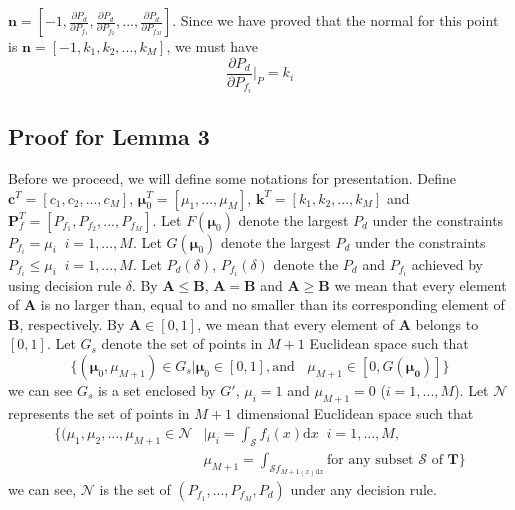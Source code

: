 \documentclass[12pt,journal,a4paper,twoside,onecolumn]{IEEEtran}
\begin{document}
\begin{spacing}{2.5}
 $\mathbf{n} = [-1, \frac{\partial P_d}{\partial P_{f_1}}, \frac{\partial P_d}{\partial P_{f_2}}, ..., \frac{\partial P_d}{\partial P_{f_M}}]$. Since we have proved that  the normal for this point is $\mathbf{n} = [-1, k_1, k_2, ..., k_M]$, we must have
\begin{equation}
\frac{\partial P_d}{\partial P_{f_i}}\bigg|_{P} = k_i
\end{equation}


\subsection{Proof for Lemma 3}
\newcommand{\bmu}{\boldsymbol{\mu}}
Before we proceed, we will define some notations for presentation.
Define $\mathbf{c}^T = [c_1, c_2, ..., c_M]$, $\boldsymbol{\mu}_0^T = [\mu_1, ..., \mu_M]$, $\mathbf{k}^T = [k_1, k_2, ..., k_M]$ and  $\mathbf{P}_f^T = [P_{f_1}, P_{f_2}, ..., P_{f_M}]$. Let $F(\boldsymbol{\mu}_0)$ denote the largest $P_d$ under the constraints $P_{f_i} = \mu_i\;\;i = 1, ..., M$.
Let $G(\boldsymbol{\mu}_0)$ denote the largest $P_d$ under the constraints $P_{f_i} \leq \mu_i\;\;i = 1, ..., M$.
Let $P_d(\delta)$, $P_{f_i}(\delta)$ denote the $P_d$ and $P_{f_i}$ achieved by using decision rule $\delta$.
By $\mathbf{A} \leq \mathbf{B}$, $\mathbf{A} = \mathbf{B}$ and  $\mathbf{A} \geq \mathbf{B}$ we mean that every element of $\mathbf{A}$ is no larger than, equal to and no smaller than its corresponding element of $\mathbf{B}$, respectively. 
By $\mathbf{A} \in [0, 1]$, we mean that every element of $\mathbf{A}$ belongs to $[0, 1]$.  
Let $G_s$ denote the set of points in $M+1$ Euclidean space such that 
\[
 \{(\boldsymbol{\mu}_0, \mu_{M+1})\in G_s | \boldsymbol{\mu}_0\in [0, 1], \text{and }\;\;\mu_{M+1} \in [0, G(\mathbf{\mu_0})]
    \}
\]
we can see $G_s$ is a set enclosed by $G'$, $\mu_i = 1$ and $\mu_{M+1}=0$ ($i=1, ..., M$).
Let $\mathcal{N}$ represents the set of points in $M+1$ dimensional Euclidean space such that  
\begin{equation}
\begin{split}
\{(\mu_1, \mu_2, ..., \mu_{M+1}\in \mathcal{N} &| \mu_i = \int_{\mathcal{S}}f_i(x)\mathrm{d}x \;\;i=1, ..., M,\\
                                            &  \mu_{M+1}=\int_{\mathcal{S}f_{M+1(x)\mathrm{d}x}} \text{for any subset $\mathcal{S}$ of $\mathbf{T}$}\}
\end{split}
\end{equation}
we can see, $\mathcal{N}$ is the set of $(P_{f_1}, ..., P_{f_M}, P_d)$ under any decision rule. 


\end{spacing}
\end{document}
